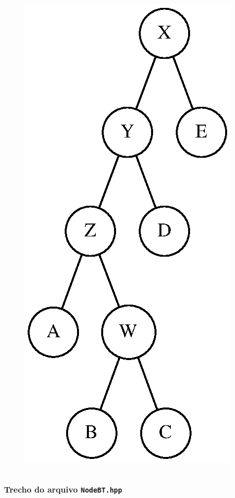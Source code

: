 \documentclass[aspectratio=169]{beamer}
\begin{document}
\begin{frame}[fragile]
\begin{columns}[T]
\begin{column}{0.25\linewidth}
\begin{figure}[h]
	\includegraphics[height=0.7\paperheight]{imagens/arvore_binaria05.eps}
\end{figure}
\end{column}
\end{columns}
\end{frame}

\begin{frame}[fragile]\frametitle{Trecho do arquivo \texttt{NodeBT.hpp}}
\fontsize{3pt}{5pt}\selectfont{

}
\end{frame}
\end{document}
